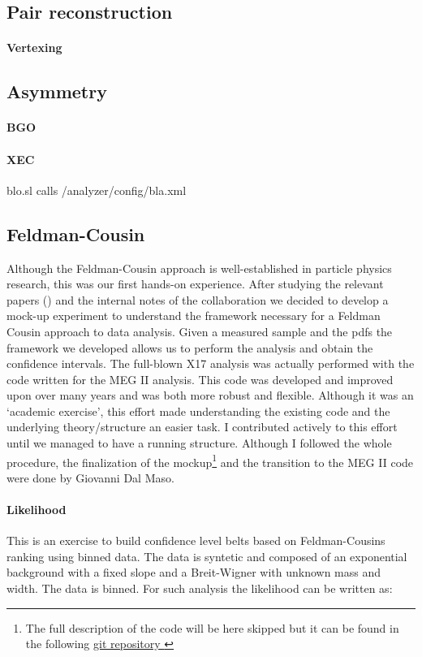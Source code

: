 \begin{refsection}
\subsection{Pair reconstruction}
\paragraph{Vertexing}
\subsection{Asymmetry}
\paragraph{BGO}
\paragraph{XEC}
blo.sl calls /analyzer/config/bla.xml

\subsection{Feldman-Cousin}
Although the Feldman-Cousin approach is well-established in particle physics research, this was our first hands-on experience. 
After studying the relevant papers (\cite{feldman:1998}\cite{feldman:2011}) and the internal notes of the collaboration we decided to develop a mock-up experiment to understand the framework necessary for a Feldman Cousin approach to data analysis.  
Given a measured sample and the pdfs the framework we developed allows us to perform the analysis and obtain the confidence intervals.
The full-blown X17 analysis was actually performed with the code written for the MEG II analysis. This code was developed and improved upon over many years and was both more robust and flexible. 
Although it was an `academic exercise', this effort made understanding the existing code and the underlying theory/structure an easier task.  
I contributed actively to this effort until we managed to have a running structure.
Although I followed the whole procedure, the finalization of the mockup\footnote{ The full description of the code will be here skipped but it can be found in the following 
\href{https://github.com/gdalmaso96/X17_LL_mock_up}{git repository \faGithubSquare}} and the transition to the MEG II code were done by Giovanni Dal Maso.

\paragraph{Likelihood}
This is an exercise to build confidence level belts based on Feldman-Cousins ranking using binned data.
The data is syntetic and composed of an exponential background with a fixed slope and a Breit-Wigner with unknown mass and width. The data is binned.
For such analysis the likelihood can be written as:



\end{refsection}

